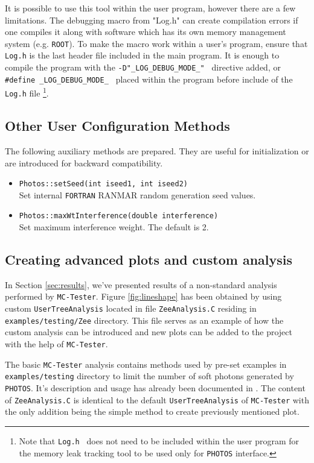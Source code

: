 \documentclass[]{Photos_interface_design}
\begin{document}
It is possible to use this tool within the user program, however there are a few limitations.
The debugging macro from "Log.h" can create compilation errors if one compiles
it along with software which has its own memory management system (e.g. {\tt ROOT}).
To make the macro work within a user's program, ensure that {\tt Log.h} is the last header file
included in the main program.
It is enough to  compile the program with the {\tt -D"\_LOG\_DEBUG\_MODE\_" } directive added,
or {\tt \#define \_LOG\_DEBUG\_MODE\_ } placed within the program before include
of the {\tt Log.h} file%
\footnote{Note that {\tt Log.h } does not need to be included within
the user program  for the memory leak tracking tool to be used only for {\tt PHOTOS} interface.
}.

\subsection{Other User Configuration Methods}
\label{subsection:other_methods}

The following auxiliary methods are prepared. They are useful for initialization 
or are introduced for backward compatibility.

\begin{itemize}
  \item {\tt Photos::setSeed(int iseed1, int iseed2)} \\
        Set internal {\tt FORTRAN} RANMAR random generation seed values.
   \item {\tt Photos::maxWtInterference(double interference)} \\
        Set maximum interference weight. The default is 2.
\end{itemize}

\subsection{Creating advanced plots and custom analysis}
\label{App:Plots}

In Section \ref{sec:results}, we've presented results of a non-standard
analysis performed by {\tt MC-Tester}. Figure \ref{fig:lineshape} has been
obtained by using custom {\tt UserTreeAnalysis} located in file {\tt ZeeAnalysis.C}
residing in {\tt examples/testing/Zee} directory. This file serves as an
example of how the custom analysis can be introduced and new plots can be
added to the project with the help of {\tt MC-Tester}.

The basic {\tt MC-Tester} analysis contains methods used by pre-set examples
in {\tt examples/testing} directory to limit the number of soft photons generated
by {\tt PHOTOS}. It's description and usage has already been documented in \cite{Davidson:2008ma}.
The content of {\tt ZeeAnalysis.C} is identical to the default {\tt UserTreeAnalysis}
of {\tt MC-Tester} with the only addition being the simple method to create
previously mentioned plot.
\end{document}
